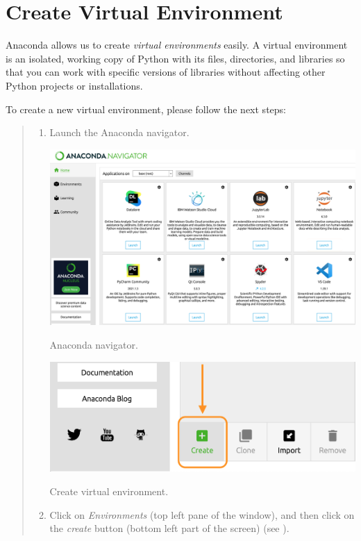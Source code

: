\documentclass{latex-template/tufte-handout}
\begin{document}
\section{Create Virtual Environment}
Anaconda allows us to create \emph{virtual environments} easily.
A virtual environment is an isolated, working copy of Python with its files, directories, and libraries so that you can work with specific versions of libraries without affecting other Python projects or installations.

To create a new virtual environment, please follow the next steps:


\begin{quote}
	\begin{enumerate}
		\item Launch the Anaconda navigator.
			\begin{marginfigure}[-50em]
			  \includegraphics[width=1.2\linewidth]{assets/01-launch}
			  \caption{Anaconda navigator.}
			  \label{fig:img1}
			\end{marginfigure}
			\begin{marginfigure}[-28em]%
			  \includegraphics[width=\linewidth]{assets/02-create-ve}
			  \caption{Create virtual environment.}
			  \label{fig:img2}
			\end{marginfigure}
		\item Click on \emph{Environments} (top left pane of the window), and then click on the \emph{create} button (bottom left part of the screen) (see ).

\end{enumerate}
\end{quote}
\end{document}
